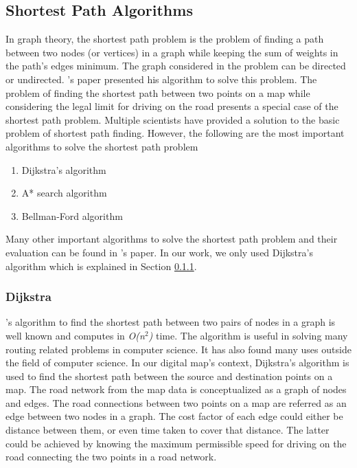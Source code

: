 \subsection{Shortest Path Algorithms}
In graph theory, the shortest path problem is the problem of finding a path between two nodes (or vertices) in a graph while keeping the sum of weights in the path's edges minimum. The graph considered in the problem can be directed or undirected. \citet{floyd1962algorithm}'s paper presented his algorithm to solve this problem. The problem of finding the shortest path between two points on a map while considering the legal limit for driving on the road presents a special case of the shortest path problem. Multiple scientists have provided a solution to the basic problem of shortest path finding. However, the following are the most important algorithms to solve the shortest path problem
\begin{enumerate}
\item Dijkstra's algorithm
\item A* search algorithm
\item Bellman-Ford algorithm
\end{enumerate}    
Many other important algorithms to solve the shortest path problem and their evaluation can be found in \citet{cherkassky1996shortest}'s paper. In our work, we only used Dijkstra's algorithm which is explained in Section \ref{dijkstra}.
\subsubsection{Dijkstra}\label{dijkstra}
\citet{dijkstra1959note}'s algorithm to find the shortest path between two pairs of nodes in a graph is well known and computes in \textit{O(n$^{2}$)} time. The algorithm is useful in solving many routing related problems in computer science. It has also found many uses outside the field of computer science. In our digital map's context, Dijkstra's algorithm is used to find the shortest path between the source and destination points on a map. The road network from the map data is conceptualized as a graph of nodes and edges. The road connections between two points on a map are referred as an edge between two nodes in a graph. The cost factor of each edge could either be distance between them, or even time taken to cover that distance. The latter could be achieved by knowing the maximum permissible speed for driving on the road connecting the two points in a road network.



